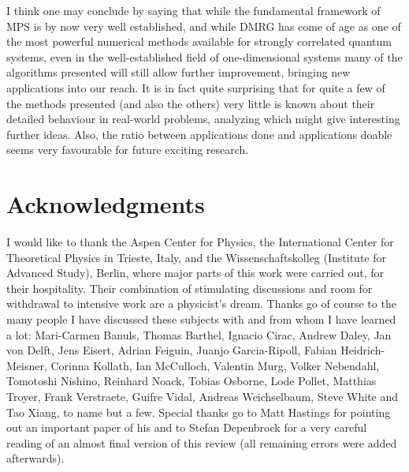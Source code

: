 \documentclass[a4paper,10pt,oneside,onecolumn,1p,times]{elsarticle}
\begin{document}
I think one may conclude by saying that while the fundamental framework of MPS is by now very well established, and while DMRG has come of age as one of the most powerful numerical methods available for strongly correlated quantum systems, even in the well-established field of one-dimensional systems many of the algorithms presented will still allow further improvement, bringing new applications into our reach. It is in fact quite surprising that for quite a few of the methods presented (and also the others) very little is known about their detailed behaviour in real-world problems, analyzing which might give interesting further ideas. Also, the ratio between applications done and applications doable seems very favourable for future exciting research.

\section{Acknowledgments}
I would like to thank the Aspen Center for Physics, the International Center for Theoretical Physics in Trieste, Italy, and the Wissenschaftskolleg (Institute for Advanced Study), Berlin, where major parts of this work were carried out, for their hospitality. Their combination of stimulating discussions and room for withdrawal to intensive work are a physicist's dream. Thanks go of course to the many people I have discussed these subjects with and from whom I have learned a lot: Mari-Carmen Banuls, Thomas Barthel, Ignacio Cirac, Andrew Daley, Jan von Delft, Jens Eisert, Adrian Feiguin, Juanjo Garcia-Ripoll, Fabian Heidrich-Meisner, Corinna Kollath, Ian McCulloch, Valentin Murg, Volker Nebendahl, Tomotoshi Nishino, Reinhard Noack, Tobias Osborne, Lode Pollet, Matthias Troyer, Frank Verstraete, Guifre Vidal, Andreas Weichselbaum, Steve White and Tao Xiang, to name but a few. Special thanks go to Matt Hastings for pointing out an important paper of his and to Stefan Depenbrock for a very careful reading of an almost final version of this review (all remaining errors were added afterwards).
\end{document}
